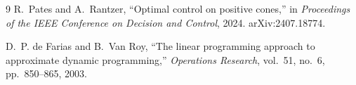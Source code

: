 \documentclass[10pt]{article}
\begin{document}
\begin{thebibliography}{9}
R.~Pates and A.~Rantzer,
``Optimal control on positive cones,''
in \emph{Proceedings of the IEEE Conference on Decision and Control}, 2024.
\newblock arXiv:2407.18774.

D.~P. de Farias and B.~Van Roy,
``The linear programming approach to approximate dynamic programming,''
\emph{Operations Research}, vol.~51, no.~6, pp.~850--865, 2003.
\end{thebibliography}
\end{document}
